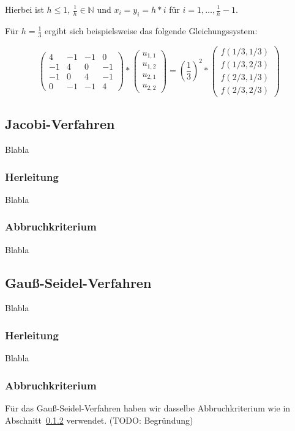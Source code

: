\documentclass{article}
\begin{document}
Hierbei ist $h \leq 1$, $\frac{1}{h} \in \mathbb{N}$ und $x_i = y_i = h*i$ für $i = 1, \ldots, \frac{1}{h} - 1$.

Für $h = \frac{1}{3}$ ergibt sich beispielsweise das folgende Gleichungssystem:

$$\begin{pmatrix}
4 & -1 & -1 & 0 \\ 
-1 & 4 & 0 & -1 \\ 
-1 & 0 & 4 & -1 \\ 
0 & -1 & -1 & 4
\end{pmatrix} *
\begin{pmatrix}
u_{1,1} \\ 
u_{1,2} \\ 
u_{2,1} \\ 
u_{2,2}
\end{pmatrix} = \left(\frac{1}{3}\right)^2 *
\begin{pmatrix}
f(1/3,1/3) \\ 
f(1/3,2/3) \\ 
f(2/3,1/3) \\ 
f(2/3,2/3)
\end{pmatrix}
$$


\subsection{Jacobi-Verfahren}
Blabla
\subsubsection{Herleitung}
Blabla
\subsubsection{Abbruchkriterium} \label{jacobi:abbruch}
Blabla

\subsection{Gauß-Seidel-Verfahren}
Blabla
\subsubsection{Herleitung}
Blabla
\subsubsection{Abbruchkriterium}
Für das Gauß-Seidel-Verfahren haben wir dasselbe Abbruchkriterium wie in Abschnitt~\ref{jacobi:abbruch} verwendet. (TODO: Begründung)
\end{document}
